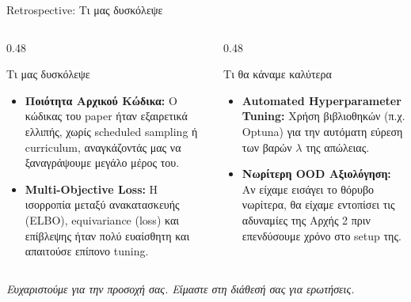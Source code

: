 \documentclass[10pt, aspectratio=169]{beamer}
\begin{document}
\begin{frame}{Retrospective: Τι μας δυσκόλεψε}
    \begin{columns}[onlytextwidth, T]
        \begin{column}{0.48\textwidth}
            \begin{block}{Τι μας δυσκόλεψε}
                \begin{itemize}
                    \item \scriptsize \textbf{Ποιότητα Αρχικού Κώδικα:} Ο κώδικας του paper ήταν εξαιρετικά ελλιπής, χωρίς scheduled sampling ή curriculum, αναγκάζοντάς μας να ξαναγράψουμε μεγάλο μέρος του.
                    \item \scriptsize \textbf{Multi-Objective Loss:} Η ισορροπία μεταξύ ανακατασκευής (\textlatin{ELBO}), equivariance (\textlatin{loss}) και επίβλεψης ήταν πολύ ευαίσθητη και απαιτούσε επίπονο \textlatin{tuning}.
                \end{itemize}
            \end{block}
        \end{column}
        \begin{column}{0.48\textwidth}
            \begin{block}{Τι θα κάναμε καλύτερα}
                \begin{itemize}
                    \item \scriptsize \textbf{Automated Hyperparameter Tuning:} Χρήση βιβλιοθηκών (π.χ. \textlatin{Optuna}) για την αυτόματη εύρεση των βαρών $\lambda$ της απώλειας.
                    \item \scriptsize \textbf{Νωρίτερη OOD Αξιολόγηση:} Αν είχαμε εισάγει το θόρυβο νωρίτερα, θα είχαμε εντοπίσει τις αδυναμίες της Αρχής 2 πριν επενδύσουμε χρόνο στο setup της.
                \end{itemize}
            \end{block}
        \end{column}
    \end{columns}
    \vspace{0.3cm}
    \centering\footnotesize\textit{Ευχαριστούμε για την προσοχή σας. Είμαστε στη διάθεσή σας για ερωτήσεις.}
\end{frame}
\end{document}

